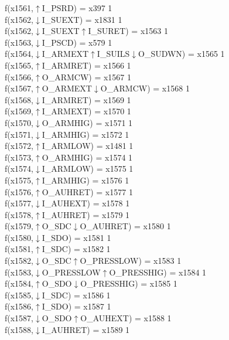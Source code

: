 f(x1561,$\uparrow$I\_PSRD) = x397 {1} \\
f(x1562,$\downarrow$I\_SUEXT) = x1831 {1} \\
f(x1562,$\downarrow$I\_SUEXT$\uparrow$I\_SURET) = x1563 {1} \\
f(x1563,$\downarrow$I\_PSCD) = x579 {1} \\
f(x1564,$\downarrow$I\_ARMEXT$\uparrow$I\_SUILS$\downarrow$O\_SUDWN) = x1565 {1} \\
f(x1565,$\uparrow$I\_ARMRET) = x1566 {1} \\
f(x1566,$\uparrow$O\_ARMCW) = x1567 {1} \\
f(x1567,$\uparrow$O\_ARMEXT$\downarrow$O\_ARMCW) = x1568 {1} \\
f(x1568,$\downarrow$I\_ARMRET) = x1569 {1} \\
f(x1569,$\uparrow$I\_ARMEXT) = x1570 {1} \\
f(x1570,$\downarrow$O\_ARMHIG) = x1571 {1} \\
f(x1571,$\downarrow$I\_ARMHIG) = x1572 {1} \\
f(x1572,$\uparrow$I\_ARMLOW) = x1481 {1} \\
f(x1573,$\uparrow$O\_ARMHIG) = x1574 {1} \\
f(x1574,$\downarrow$I\_ARMLOW) = x1575 {1} \\
f(x1575,$\uparrow$I\_ARMHIG) = x1576 {1} \\
f(x1576,$\uparrow$O\_AUHRET) = x1577 {1} \\
f(x1577,$\downarrow$I\_AUHEXT) = x1578 {1} \\
f(x1578,$\uparrow$I\_AUHRET) = x1579 {1} \\
f(x1579,$\uparrow$O\_SDC$\downarrow$O\_AUHRET) = x1580 {1} \\
f(x1580,$\downarrow$I\_SDO) = x1581 {1} \\
f(x1581,$\uparrow$I\_SDC) = x1582 {1} \\
f(x1582,$\downarrow$O\_SDC$\uparrow$O\_PRESSLOW) = x1583 {1} \\
f(x1583,$\downarrow$O\_PRESSLOW$\uparrow$O\_PRESSHIG) = x1584 {1} \\
f(x1584,$\uparrow$O\_SDO$\downarrow$O\_PRESSHIG) = x1585 {1} \\
f(x1585,$\downarrow$I\_SDC) = x1586 {1} \\
f(x1586,$\uparrow$I\_SDO) = x1587 {1} \\
f(x1587,$\downarrow$O\_SDO$\uparrow$O\_AUHEXT) = x1588 {1} \\
f(x1588,$\downarrow$I\_AUHRET) = x1589 {1} \\
